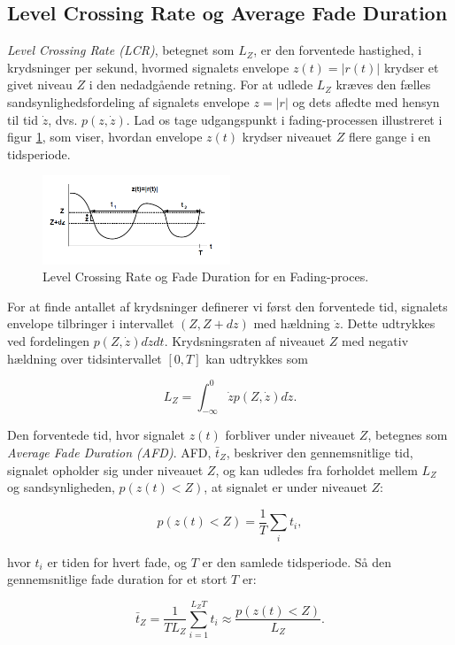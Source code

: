 \documentclass[a4paper,12pt]{book}
\begin{document}
	\subsection{Level Crossing Rate og Average Fade Duration}
	\textit{Level Crossing Rate (LCR)}, betegnet som $L_Z$, er den forventede hastighed, i krydsninger per sekund, hvormed signalets envelope $z(t) = |r(t)|$ krydser et givet niveau $Z$ i den nedadgående retning. For at udlede $L_Z$ kræves den fælles sandsynlighedsfordeling af signalets envelope $z = |r|$ og dets afledte med hensyn til tid $\dot{z}$, dvs. $p(z, \dot{z})$. Lad os tage udgangspunkt i fading-processen illustreret i figur \ref{fig:level_crossing}, som viser, hvordan envelope $z(t)$ krydser niveauet $Z$ flere gange i en tidsperiode.
	
	\begin{figure}[h]
		\centering
		\includegraphics[width=0.5\textwidth]{fig/fig25.png}
		\caption{Level Crossing Rate og Fade Duration for en Fading-proces.}
		\label{fig:level_crossing}
	\end{figure}
	
	For at finde antallet af krydsninger definerer vi først den forventede tid, signalets envelope tilbringer i intervallet $(Z, Z+dz)$ med hældning $\dot{z}$. Dette udtrykkes ved fordelingen $p(Z, \dot{z})d\dot{z}dt$. Krydsningsraten af niveauet $Z$ med negativ hældning over tidsintervallet $[0, T]$ kan udtrykkes som
	
	\[
	L_Z = \int_{-\infty}^{0} \dot{z} p(Z, \dot{z}) d\dot{z}.
	\]
	
	Den forventede tid, hvor signalet $z(t)$ forbliver under niveauet $Z$, betegnes som \textit{Average Fade Duration (AFD)}. AFD, $\bar{t}_Z$, beskriver den gennemsnitlige tid, signalet opholder sig under niveauet $Z$, og kan udledes fra forholdet mellem $L_Z$ og sandsynligheden, $p(z(t) < Z)$, at signalet er under niveauet $Z$:
	
	\[
	p(z(t) < Z) = \frac{1}{T}\sum_{i} t_i,
	\]
	
	hvor $t_i$ er tiden for hvert fade, og $T$ er den samlede tidsperiode. Så den gennemsnitlige fade duration for et stort $T$ er:
	
	\[
	\bar{t}_Z = \frac{1}{T L_Z} \sum_{i=1}^{L_Z T} t_i \approx \frac{p(z(t) < Z)}{L_Z}.
	\]
	
\end{document}
